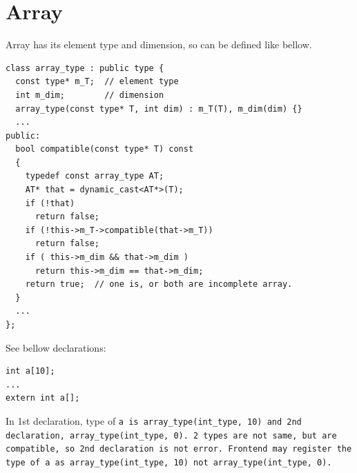 \section{Array}

Array has its element type and dimension, so can be defined like bellow.

\begin{verbatim}
class array_type : public type {
  const type* m_T;  // element type
  int m_dim;        // dimension
  array_type(const type* T, int dim) : m_T(T), m_dim(dim) {}
  ...
public:
  bool compatible(const type* T) const
  {
    typedef const array_type AT;
    AT* that = dynamic_cast<AT*>(T);
    if (!that)
      return false;
    if (!this->m_T->compatible(that->m_T))
      return false;
    if ( this->m_dim && that->m_dim )
      return this->m_dim == that->m_dim;
    return true;  // one is, or both are incomplete array.
  }
  ...
};
\end{verbatim}
See bellow declarations:
\begin{verbatim}
int a[10];
...
extern int a[];
\end{verbatim}
In 1st declaration, type of \tt{a} is
\tt{array\_type(int\_type, 10)} and 2nd declaration,
\tt{array\_type(int\_type, 0)}. 2 types are not
same, but are compatible, so 2nd declaration is
not error. Frontend may register the type of \tt{a}
as \tt{array\_type(int\_type, 10)} not
\tt{array\_type(int\_type, 0)}.

